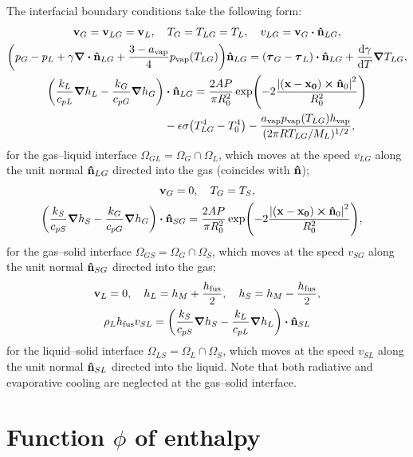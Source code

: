 \documentclass{article}
\newcommand{\fusion}[1]{{#1}_\mathrm{fus}}
\newcommand{\evapor}[1]{{#1}_\mathrm{vap}}
\newcommand{\bv}{\vb{v}}
\newcommand{\bn}{\vu{n}}
\newcommand{\btau}{\vb*\tau}
\begin{document}
The interfacial boundary conditions take the following form:
\begin{gather}
    \bv_G = \bv_{LG} = \bv_L, \quad T_G = T_{LG} = T_L, \quad v_{LG} = \bv_G\vdot\bn_{LG}, \\
    \qty(p_G - p_L + \gamma\div\bn_{LG} + \frac{3-\evapor{a}}4\evapor{p}(T_{LG}))\bn_{LG}
    = (\btau_G - \btau_L)\vdot\bn_{LG} + \dv{\gamma}{T}\grad{T_{LG}}, \\
    \begin{aligned}
    \qty( \frac{k_L}{c_{pL}}\grad{h}_L - \frac{k_G}{c_{pG}}\grad{h}_G )&\vdot\bn_{LG}
        = \frac{2AP}{\pi R_0^2}\exp(-2\frac{\abs{(\vb{x}-\vb{x_0})\cp\bn_0}^2}{R_0^2}) \\
        &- \epsilon\sigma\qty(T_{LG}^4-T_0^4)
        - \frac{\evapor{a}\evapor{p}(T_{LG})\evapor{h}}{(2\pi RT_{LG}/M_L)^{1/2}},
    \end{aligned}
\end{gather}
for the gas--liquid interface $\Omega_{GL} = \Omega_G\cap\Omega_L$,
which moves at the speed $v_{LG}$ along the unit normal $\bn_{LG}$ directed into the gas (coincides with $\bn$);
\begin{gather}
    \bv_G = 0, \quad T_G = T_S, \\
    \begin{aligned}
    \qty( \frac{k_S}{c_{pS}}\grad{h}_S - \frac{k_G}{c_{pG}}\grad{h}_G )&\vdot\bn_{SG}
        = \frac{2AP}{\pi R_0^2}\exp(-2\frac{\abs{(\vb{x}-\vb{x_0})\cp\bn_0}^2}{R_0^2}),
    \end{aligned}
\end{gather}
for the gas--solid interface $\Omega_{GS} = \Omega_G\cap\Omega_S$,
which moves at the speed $v_{SG}$ along the unit normal $\bn_{SG}$ directed into the gas;
\begin{gather}
    \bv_L = 0, \quad h_L = h_M + \frac{\fusion{h}}2, \quad
        h_S = h_M - \frac{\fusion{h}}2, \\
    \rho_L\fusion{h}v_{SL} = \qty(
        \frac{k_S}{c_{pS}}\grad{h}_S - \frac{k_L}{c_{pL}}\grad{h}_L )\vdot\bn_{SL}
\end{gather}
for the liquid--solid interface $\Omega_{LS} = \Omega_L\cap\Omega_S$,
which moves at the speed $v_{SL}$ along the unit normal $\bn_{SL}$ directed into the liquid.
Note that both radiative and evaporative cooling are neglected at the gas--solid interface.

\section{Function \texorpdfstring{$\phi$}{} of enthalpy}\label{sec:phi}
\end{document}

